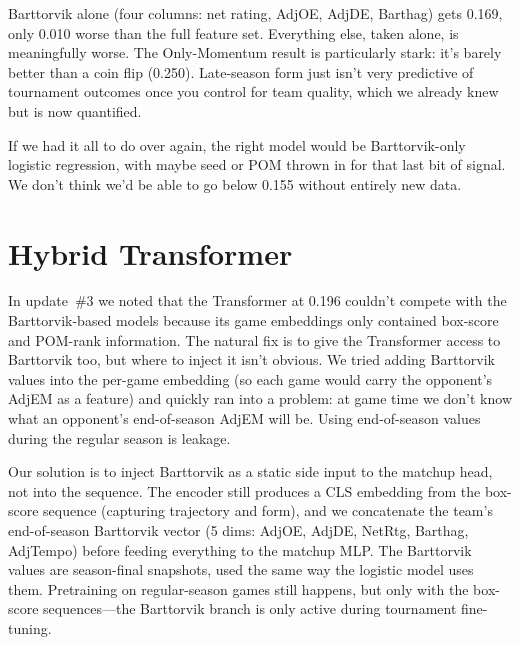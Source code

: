 \documentclass[11pt,a4paper]{article}
\begin{document}
Barttorvik alone (four columns: net rating, AdjOE, AdjDE, Barthag) gets 0.169, only 0.010 worse than the full feature set. Everything else, taken alone, is meaningfully worse. The Only-Momentum result is particularly stark: it's barely better than a coin flip (0.250). Late-season form just isn't very predictive of tournament outcomes once you control for team quality, which we already knew but is now quantified.

If we had it all to do over again, the right model would be Barttorvik-only logistic regression, with maybe seed or POM thrown in for that last bit of signal. We don't think we'd be able to go below 0.155 without entirely new data.


\section{Hybrid Transformer}

In update~\#3 we noted that the Transformer at 0.196 couldn't compete with the Barttorvik-based models because its game embeddings only contained box-score and POM-rank information. The natural fix is to give the Transformer access to Barttorvik too, but where to inject it isn't obvious. We tried adding Barttorvik values into the per-game embedding (so each game would carry the opponent's AdjEM as a feature) and quickly ran into a problem: at game time we don't know what an opponent's end-of-season AdjEM will be. Using end-of-season values during the regular season is leakage.

Our solution is to inject Barttorvik as a static side input to the matchup head, not into the sequence. The encoder still produces a CLS embedding from the box-score sequence (capturing trajectory and form), and we concatenate the team's end-of-season Barttorvik vector (5 dims: AdjOE, AdjDE, NetRtg, Barthag, AdjTempo) before feeding everything to the matchup MLP. The Barttorvik values are season-final snapshots, used the same way the logistic model uses them. Pretraining on regular-season games still happens, but only with the box-score sequences—the Barttorvik branch is only active during tournament fine-tuning.
\end{document}
